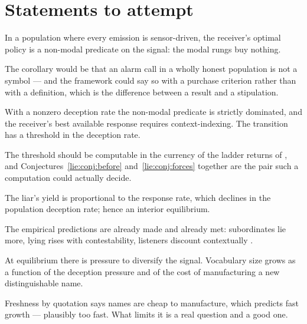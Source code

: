 \section{Statements to attempt}
\label{sec:lie-props}

\begin{conjecture}
\label{lie:conj:before}
In a population where every emission is sensor-driven, the receiver's optimal
policy is a non-modal predicate on the signal: the modal rungs buy nothing.
\end{conjecture}

The corollary would be that an alarm call in a wholly honest population is not a
symbol --- and the framework could say so with a purchase criterion rather than
with a definition, which is the difference between a result and a stipulation.

\begin{conjecture}
\label{lie:conj:forces}
With a nonzero deception rate the non-modal predicate is strictly dominated, and
the receiver's best available response requires context-indexing. The transition
has a threshold in the deception rate.
\end{conjecture}

The threshold should be computable in the currency of the ladder returns of
\chGame, and Conjectures~\ref{lie:conj:before} and~\ref{lie:conj:forces} together
are the pair such a computation could actually decide.

\begin{conjecture}
\label{lie:conj:equil}
The liar's yield is proportional to the response rate, which declines in the
population deception rate; hence an interior equilibrium.
\end{conjecture}

The empirical predictions are already made and already met: subordinates lie
more, lying rises with contestability, listeners discount contextually
\cite{wheelerbc2009,wheelerbc2010}.

\begin{conjecture}
\label{lie:conj:elab}
At equilibrium there is pressure to diversify the signal. Vocabulary size grows
as a function of the deception pressure and of the cost of manufacturing a new
distinguishable name.
\end{conjecture}

Freshness by quotation says names are cheap to manufacture, which predicts fast
growth --- plausibly too fast. What limits it is a real question and a good one.

